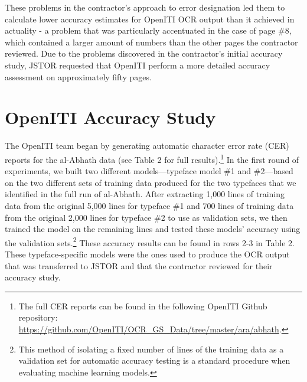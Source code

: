 These problems in the contractor’s approach to error designation led them to
calculate lower accuracy estimates for OpenITI OCR output than it achieved in
actuality - a problem that was particularly accentuated in the case of page \#8,
which contained a larger amount of numbers than the other pages the contractor
reviewed. Due to the problems discovered in the contractor’s initial accuracy
study, JSTOR requested that OpenITI perform a more detailed accuracy assessment
on approximately fifty pages. 

\section{OpenITI Accuracy Study}

The OpenITI team began by generating automatic character error rate (CER)
reports for the al-Abhath data (see Table 2 for full results).\footnote{The
full CER reports can be found in the following OpenITI Github repository:
\url{https://github.com/OpenITI/OCR_GS_Data/tree/master/ara/abhath}.} In the
first round of experiments, we built two different models—typeface model \#1 and
\#2—based on the two different sets of training data produced for the two
typefaces that we identified in the full run of al-Abhath. After extracting
1,000 lines of training data from the original 5,000 lines for typeface \#1 and
700 lines of training data from the original 2,000 lines for typeface \#2 to
use as validation sets, we then trained the model on the remaining lines and
tested these models’ accuracy using the validation sets.\footnote{This method
of isolating a fixed number of lines of the training data as a validation set
for automatic accuracy testing is a standard procedure when evaluating machine
learning models.} These accuracy results can be found in rows 2-3 in Table 2.
These typeface-specific models were the ones used to produce the OCR output
that was transferred to JSTOR and that the contractor reviewed for their
accuracy study.

